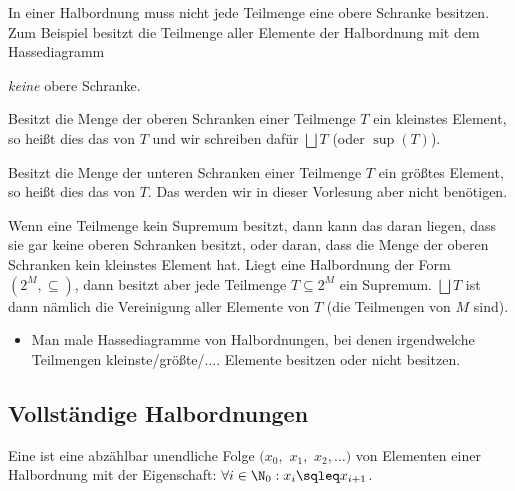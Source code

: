 In einer Halbordnung muss nicht jede Teilmenge eine obere Schranke
besitzen. Zum Beispiel besitzt die Teilmenge aller Elemente der
Halbordnung mit dem Hassediagramm
\emph{keine} obere Schranke.

Besitzt die Menge der oberen Schranken einer Teilmenge $T$ ein
kleinstes Element, so heißt dies das
 von $T$ und wir schreiben dafür
$\bigsqcup T$ (oder $\sup(T)$).

Besitzt die Menge der unteren Schranken einer Teilmenge $T$ ein
größtes Element, so heißt dies das 
von $T$. Das werden wir in dieser Vorlesung aber nicht benötigen.

Wenn eine Teilmenge kein Supremum besitzt, dann kann das daran liegen,
dass sie gar keine oberen Schranken besitzt, oder daran, dass die
Menge der oberen Schranken kein kleinstes Element hat. Liegt eine
Halbordnung der Form $(2^M, \subseteq)$, dann besitzt aber jede
Teilmenge $T\subseteq 2^M$ ein Supremum. $\bigsqcup T$ ist dann
nämlich die Vereinigung aller Elemente von $T$ (die Teilmengen von $M$
sind).

\begin{tutorium}
  \begin{itemize}
  \item Man male Hassediagramme von Halbordnungen, bei denen
    irgendwelche Teilmengen kleinste/größte/.... Elemente besitzen
    oder nicht besitzen.
  \end{itemize}
\end{tutorium}

\Tut\subsection{Vollst\"andige Halbordnungen}
\label{sub:voll-halb-ord}

Eine  ist eine
abzählbar unendliche Folge $(x_0,$ $x_1,$ $x_2,\dots)$ von Elementen einer
Halbordnung mit der Eigenschaft: $\forall i\in\N_0: x_i \sqleq x_{i+1}$.

